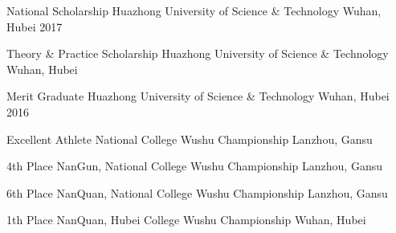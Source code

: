 


\vspace{-1.5mm}
\begin{cvhonors}


\cvhonor
{National Scholarship} %
{Huazhong University of Science \& Technology} %
{Wuhan, Hubei} %
{2017} %


\cvhonor
{Theory \& Practice Scholarship} %
{Huazhong University of Science \& Technology} %
{Wuhan, Hubei} %
{ } %

\cvhonor
{Merit Graduate } %
{Huazhong University of Science \& Technology} %
{Wuhan, Hubei} %
{2016} %



\cvhonor
{Excellent Athlete} %
{National College Wushu Championship} %
{Lanzhou, Gansu} %
{ } %


\cvhonor
{4th Place} %
{NanGun, National College Wushu Championship} %
{Lanzhou, Gansu} %
{ } %


\cvhonor
{6th Place} %
{NanQuan, National College Wushu Championship} %
{Lanzhou, Gansu} %
{ } %


\cvhonor
{1th Place} %
{NanQuan, Hubei College Wushu Championship} %
{Wuhan, Hubei} %
{ } %



\end{cvhonors}
